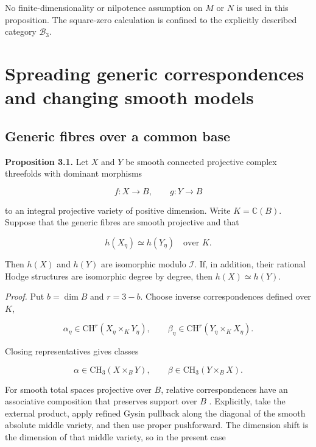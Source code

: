 \documentclass[11pt,a4paper]{article}
\begin{document}
No finite-dimensionality or nilpotence assumption on $M$ or $N$ is used in this proposition. The square-zero calculation is confined to the explicitly described category $\mathcal B_3$.

\section{Spreading generic correspondences and changing smooth models}

\subsection{Generic fibres over a common base}

\noindent \textbf{Proposition 3.1.} Let $X$ and $Y$ be smooth connected projective complex threefolds with dominant morphisms

\begin{equation*}
f:X\longrightarrow B,
\qquad
g:Y\longrightarrow B
\end{equation*}

to an integral projective variety of positive dimension. Write $K=\mathbb C(B)$. Suppose that the generic fibres are smooth projective and that

\begin{equation*}
h(X_\eta)\simeq h(Y_\eta)
\quad\text{over }K.
\end{equation*}

Then $h(X)$ and $h(Y)$ are isomorphic modulo $\mathcal I$. If, in addition, their rational Hodge structures are isomorphic degree by degree, then $h(X)\simeq h(Y)$.

\noindent \emph{Proof.} Put $b=\dim B$ and $r=3-b$. Choose inverse correspondences defined over $K$,

\begin{equation*}
\alpha_\eta\in\mathrm{CH}^r(X_\eta\times_K Y_\eta),
\qquad
\beta_\eta\in\mathrm{CH}^r(Y_\eta\times_K X_\eta).
\end{equation*}

Closing representatives gives classes

\begin{equation*}
\alpha\in\mathrm{CH}_3(X\times_B Y),
\qquad
\beta\in\mathrm{CH}_3(Y\times_B X).
\tag{3.1}
\end{equation*}

For smooth total spaces projective over $B$, relative correspondences have an associative composition that preserves support over $B$ \cite[\S{}3.1]{CH07}. Explicitly, take the external product, apply refined Gysin pullback along the diagonal of the smooth absolute middle variety, and then use proper pushforward. The dimension shift is the dimension of that middle variety, so in the present case
\end{document}
